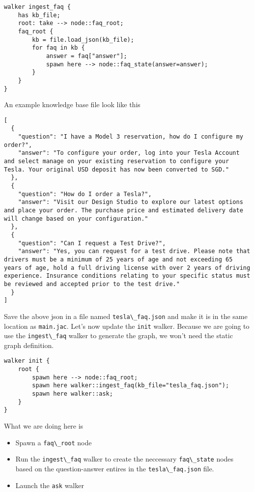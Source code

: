 \begin{lstlisting}
walker ingest_faq {
    has kb_file;
    root: take --> node::faq_root;
    faq_root {
        kb = file.load_json(kb_file);
        for faq in kb {
            answer = faq["answer"];
            spawn here --> node::faq_state(answer=answer);
        }
    }
}
\end{lstlisting}

An example knowledge base file look like this

\begin{lstlisting}
[
  {
    "question": "I have a Model 3 reservation, how do I configure my order?",
    "answer": "To configure your order, log into your Tesla Account and select manage on your existing reservation to configure your Tesla. Your original USD deposit has now been converted to SGD."
  },
  {
    "question": "How do I order a Tesla?",
    "answer": "Visit our Design Studio to explore our latest options and place your order. The purchase price and estimated delivery date will change based on your configuration."
  },
  {
    "question": "Can I request a Test Drive?",
    "answer": "Yes, you can request for a test drive. Please note that drivers must be a minimum of 25 years of age and not exceeding 65 years of age, hold a full driving license with over 2 years of driving experience. Insurance conditions relating to your specific status must be reviewed and accepted prior to the test drive."
  }
]
\end{lstlisting}

Save the above json in a file named
\passthrough{\lstinline!tesla\_faq.json!} and make it is in the same
location as \passthrough{\lstinline!main.jac!}. Let's now update the
\passthrough{\lstinline!init!} walker. Because we are going to use the
\passthrough{\lstinline!ingest\_faq!} walker to generate the graph, we
won't need the static graph definition.

\begin{lstlisting}
walker init {
    root {
        spawn here --> node::faq_root;
        spawn here walker::ingest_faq(kb_file="tesla_faq.json");
        spawn here walker::ask;
    }
}
\end{lstlisting}

What we are doing here is

\begin{itemize}
\tightlist
\item
  Spawn a \passthrough{\lstinline!faq\_root!} node
\item
  Run the \passthrough{\lstinline!ingest\_faq!} walker to create the
  neccessary \passthrough{\lstinline!faq\_state!} nodes based on the
  question-answer entires in the
  \passthrough{\lstinline!tesla\_faq.json!} file.
\item
  Launch the \passthrough{\lstinline!ask!} walker
\end{itemize}

